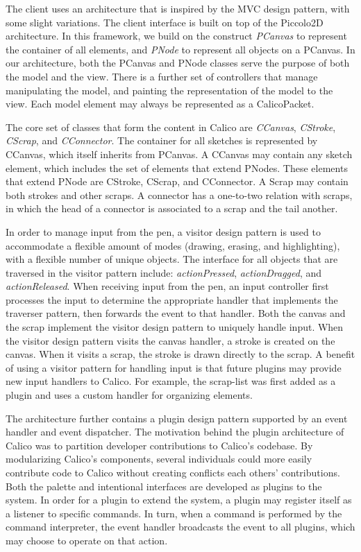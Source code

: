 The client uses an architecture that is inspired by the MVC design pattern, with some slight variations. The client interface is built on top of the Piccolo2D architecture. In this framework, we build on the construct \textit{PCanvas} to represent the container of all elements, and \textit{PNode} to represent all objects on a PCanvas. In our architecture, both the PCanvas and PNode classes serve the purpose of both the model and the view. There is a further set of controllers that manage manipulating the model, and painting the representation of the model to the view. Each model element may always be represented as a CalicoPacket. 

The core set of classes that form the content in Calico are \textit{CCanvas}, \textit{CStroke}, \textit{CScrap}, and \textit{CConnector}. The container for all sketches is represented by CCanvas, which itself inherits from PCanvas. A CCanvas may contain any sketch element, which includes the set of elements that extend PNodes. These elements that extend PNode are CStroke, CScrap, and CConnector. A Scrap may contain both strokes and other scraps. A connector has a one-to-two relation with scraps, in which the head of a connector is associated to a scrap and the tail another.

In order to manage input from the pen, a visitor design pattern is used to accommodate a flexible amount of modes (drawing, erasing, and highlighting), with a flexible number of unique objects. The interface for all objects that are traversed in the visitor pattern include: \textit{actionPressed}, \textit{actionDragged}, and \textit{actionReleased}. When receiving input from the pen, an input controller first processes the input to determine the appropriate handler that implements the traverser pattern, then forwards the event to that handler. Both the canvas and the scrap implement the visitor design pattern to uniquely handle input. When the visitor design pattern visits the canvas handler, a stroke is created on the canvas. When it visits a scrap, the stroke is drawn directly to the scrap. A benefit of using a visitor pattern for handling input is that future plugins may provide new input handlers to Calico. For example, the scrap-list was first added as a plugin and uses a custom handler for organizing elements.

The architecture further contains a plugin design pattern supported by an event handler and event dispatcher. The motivation behind the plugin architecture of Calico was to partition developer contributions to Calico's codebase. By modularizing Calico's components, several individuals could more easily contribute code to Calico without creating conflicts each others' contributions. Both the palette and intentional interfaces are developed as plugins to the system. In order for a plugin to extend the system, a plugin may register itself as a listener to specific commands. In turn, when a command is performed by the command interpreter, the event handler broadcasts the event to all plugins, which may choose to operate on that action.

